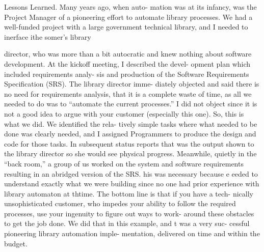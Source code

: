 \documentclass{book}
\begin{document}
\begin{multicols}{2}
Lessons Learned. Many years ago, when auto-
mation was at its infancy, was the Project
Manager of a pioneering effort to automate
library processes. We had a well-funded project
with a large government technical library, and I
needed to inerface ithe somer’s library

director, who was more than a bit autocratic and
knew nothing about software development.
At the kickoff meeting, I described the devel-
opment plan which included requirements analy-
sis and production of the Software Requirements
Specification (SRS). The library director imme-
diately objected and said there is no need for
requirements analysis, that it is a complete waste
of time, as all we needed to do was to “automate
the current processes.”
I did not object since it is not a good idea to
argue with your customer (especially this one).
So, this is what we did. We identified the rela-
tively simple tasks where what needed to be done
was clearly needed, and I assigned Programmers
to produce the design and code for those tasks.
In subsequent status reports that was the output
shown to the library director so she would see
physical progress.
Meanwhile, quietly in the “back room,” a
group of us worked on the system and software
requirements resulting in an abridged version of
the SRS. his was necessary because e eeded
to understand exactly what we were building
since no one had prior experience with library
automaton at thtime.
The bottom line is that if you have a tech-
nically unsophisticated customer, who impedes
your ability to follow the required processes,
use your ingenuity to figure out ways to work-
around these obstacles to get the job done. We
did that in this example, and t was a very suc-
cessful pioneering library automation imple-
mentation, delivered on time and within the
budget.


\end{multicols}
\end{document}
